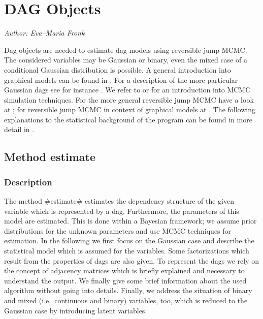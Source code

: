 \chapter{DAG Objects}
  \label{dag}

{\em Author: Eva--Maria Fronk} \\
\vspace{0.3cm}



Dag objects are needed to estimate dag models using reversible
jump MCMC. The considered variables may be Gaussian or binary,
even the mixed case of a conditional Gaussian distribution is
possible. A general introduction into graphical models can be
found in . For a description of the more
particular Gaussian dags see for instance . We refer to  or  for an
introduction into MCMC simulation techniques. For the more general
reversible jump MCMC have a look at ; for reversible
jump MCMC in context of graphical models at . The following explanations to the statistical background
of the program can be found in more detail in .



\section{Method estimate}



\subsection{Description}

The method #estimate# estimates the dependency structure of the
given variable which is represented by a dag. Furthermore, the
parameters of this model are estimated. This is done within a
Bayesian framework; we assume prior distributions for the unknown
parameters and use MCMC techniques for estimation. In the
following we first focus on the Gaussian case  and describe the
statistical model which is assumed for the variables. Some
factorizations which result from the properties of dags are also
given. To represent the dags we rely on the concept of adjacency
matrices which is briefly explained and necessary to understand
the output. We finally give some brief information about the used
algorithm without going into details. Finally, we address the
situation of binary and mixed (i.e.~continuous and binary)
variables, too, which is reduced to the Gaussian case by
introducing latent variables.

